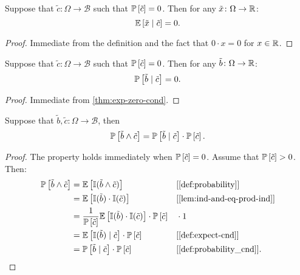 \begin{theorem} \label{thm:exp-zero-cond}
Suppose that $\tilde{c} \colon \Omega \to \mathcal{B}$ such that $\mathbb{P}\left[ \tilde{c} \right] = 0$. Then for any $\tilde{x} \colon \Omega \to \mathbb{R}$:
\[
\mathbb{E} \left[ \tilde{x} \mid \tilde{c} \right] = 0.
\]
\end{theorem}
\begin{proof}
Immediate from the definition and the fact that $0 \cdot  x = 0$ for $x\in \mathbb{R}$.
\end{proof}

\begin{theorem} \label{thm:prob-zero-cond}
Suppose that $\tilde{c} \colon \Omega \to \mathcal{B}$ such that $\mathbb{P}\left[ \tilde{c} \right] = 0$. Then for any $\tilde{b} \colon \Omega \to \mathbb{R}$:
\[
\mathbb{P}\left[ \tilde{b} \mid \tilde{c} \right] = 0.
\]
\end{theorem}
\begin{proof}
Immediate from \cref{thm:exp-zero-cond}.
\end{proof}

\begin{theorem} \label{thm:prob-eq-prob-cond-prob}
Suppose that $\tilde{b}, \tilde{c} \colon \Omega \to \mathcal{B}$, then
\[
\mathbb{P} \left[ \tilde{b} \wedge \tilde{c} \right] 
=
\mathbb{P} \left[ \tilde{b} \mid \tilde{c} \right] \cdot \mathbb{P} \left[ \tilde{c} \right].
\]
\end{theorem}
\begin{proof} The property holds immediately when $\mathbb{P} \left[ \tilde{c} \right] = 0$. Assume that $\mathbb{P} \left[ \tilde{c} \right] > 0$. Then:
  \begin{align*}
    \PP \left[ \tilde{b} \wedge \tilde{c} \right]
    &= \E \left[ \I(\tilde{b} \wedge \tilde{c}) \right] && \why{\cref{def:probability}} \\
    &= \E \left[ \I(\tilde{b}) \cdot \I(\tilde{c}) \right] && \why{\cref{lem:ind-and-eq-prod-ind}}\\
    &= \frac{1}{\PP \left[ \tilde{c} \right]}\E \left[ \I(\tilde{b}) \cdot \I(\tilde{c}) \right] \cdot \PP \left[ \tilde{c} \right] && \cdot 1 \\
    &= \E \left[ \I(\tilde{b}) \mid \tilde{c} \right] \cdot \PP \left[ \tilde{c} \right]
    && \why{\cref{def:expect-cnd}} \\
    &= \PP \left[ \tilde{b} \mid \tilde{c} \right] \cdot \PP \left[ \tilde{c} \right] && \why{\cref{def:probability_cnd}}.
  \end{align*}
\end{proof}

